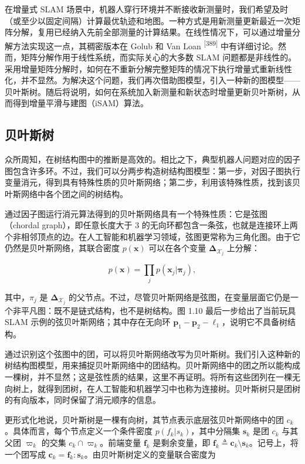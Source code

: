 在增量式 SLAM 场景中，机器人穿行环境并不断接收新测量时，我们希望及时（或至少以固定间隔）计算最优轨迹和地图。一种方式是用新测量更新最近一次矩阵分解，复用已经纳入先前全部测量的计算结果。在线性情况下，可以通过增量分解方法实现这一点，其稠密版本在 Golub 和 Van Loan \textsuperscript{[389]} 中有详细讨论。然而，矩阵分解作用于线性系统，而实际关心的大多数 SLAM 问题都是非线性的。采用增量矩阵分解时，如何在不重新分解完整矩阵的情况下执行增量式重新线性化，并不显然。为解决这个问题，我们再次借助图模型，引入一种新的图模型——贝叶斯树。随后将说明，如何在系统加入新测量和新状态时增量更新贝叶斯树，从而得到增量平滑与建图（iSAM）算法。

\subsection{贝叶斯树}

众所周知，在树结构图中的推断是高效的。相比之下，典型机器人问题对应的因子图包含许多环。不过，我们可以分两步构造树结构图模型：第一步，对因子图执行变量消元，得到具有特殊性质的贝叶斯网络；第二步，利用该特殊性质，找到该贝叶斯网络中各个团之间的树结构。

通过因子图运行消元算法得到的贝叶斯网络具有一个特殊性质：它是弦图（chordal graph），即任意长度大于 3 的无向环都包含一条弦，也就是连接环上两个非相邻顶点的边。在人工智能和机器学习领域，弦图更常称为三角化图。由于它仍然是贝叶斯网络，其联合密度 $p(\pmb x)$ 可以在各个变量 $\boldsymbol\Delta_{\boldsymbol{\mathcal{X}}_j}$ 上分解：

\begin{equation}
p (\boldsymbol {x}) = \prod_ {j} p (\boldsymbol {x} _ {j} | \boldsymbol {\pi} _ {j}),\tag{1.54}
\end{equation}

其中，$\pi_j$ 是 $\boldsymbol\Delta_{\boldsymbol{\mathcal{X}}_j}$ 的父节点。不过，尽管贝叶斯网络是弦图，在变量层面它仍是一个非平凡图：既不是链式结构，也不是树结构。图 1.10 最后一步给出了当前玩具 SLAM 示例的弦贝叶斯网络；其中存在无向环 $\pmb p_1-\pmb p_2-\pmb\ell_1$，说明它不具备树结构。

通过识别这个弦图中的团，可以将贝叶斯网络改写为贝叶斯树。我们引入这种新的树结构图模型，用来捕捉贝叶斯网络中的团结构。贝叶斯网络中的团之所以能构成一棵树，并不显然；这是弦性质的结果，这里不再证明。将所有这些团列在一棵无向树上，就得到团树，在人工智能和机器学习中也称为连接树。贝叶斯树只是团树的有向版本，同时保留了消元顺序的信息。

更形式化地说，贝叶斯树是一棵有向树，其节点表示底层弦贝叶斯网络中的团 $c_k$。具体而言，每个节点定义一个条件密度 $p(f_k|s_k)$，其中分隔集 $\pmb s_k$ 是团 $c_k$ 与其父团 $\varpi_k$ 的交集 $c_k\cap\varpi_k$。前端变量 $\pmb f_k$ 是剩余变量，即 $\pmb f_k\triangleq\pmb c_k\setminus\pmb s_k$。记号上，将一个团写成 $\pmb c_k=\pmb f_k:\pmb s_k$。由贝叶斯树定义的变量联合密度为

